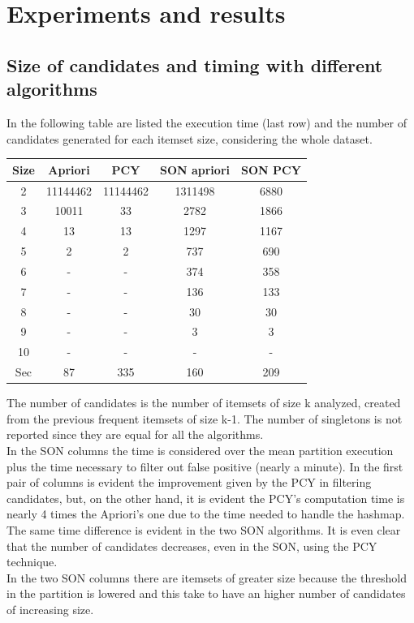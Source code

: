 \documentclass[14pt]{extarticle}
\begin{document}
\section{Experiments and results}
\subsection{Size of candidates and timing with different algorithms}
In the following table are listed the execution time (last row) and the number of candidates generated for each itemset size, considering the whole dataset.
\begin{center}
\begin{tabular}{ |c|c|c|c|c| } 
 \hline
 Size & Apriori & PCY & SON apriori & SON PCY \\
 \hline
 2 & 11144462 & 11144462 & 1311498 & 6880\\ 
 3 & 10011 & 33 & 2782 & 1866\\ 
 4 & 13 & 13 & 1297 & 1167\\ 
 5 & 2 & 2 & 737 & 690 \\
 6 & - & - & 374 & 358 \\
 7 & - & - & 136 & 133 \\
 8 & - & - & 30 & 30 \\
 9 & - & - & 3 & 3 \\
 10 & - & - & - & - \\
 \hline
 Sec & 87 & 335 & 160 & 209\\
 \hline
\end{tabular}
\end{center}
The number of candidates is the number of itemsets of size k analyzed, created from the previous frequent itemsets of size k-1. The number of singletons is not reported since they are equal for all the algorithms.\\
In the SON columns the time is considered over the mean partition execution plus the time necessary to filter out false positive (nearly a minute).
In the first pair of columns is evident the improvement given by the PCY in filtering candidates, but, on the other hand, it is evident the PCY's computation time is nearly 4 times the Apriori's one due to the time needed to handle the hashmap. The same time difference is evident in the two SON algorithms. It is even clear that the number of candidates decreases, even in the SON, using the PCY technique.\\
In the two SON columns there are itemsets of greater size because the threshold in the partition is lowered and this take to have an higher number of candidates of increasing size.
\end{document}
